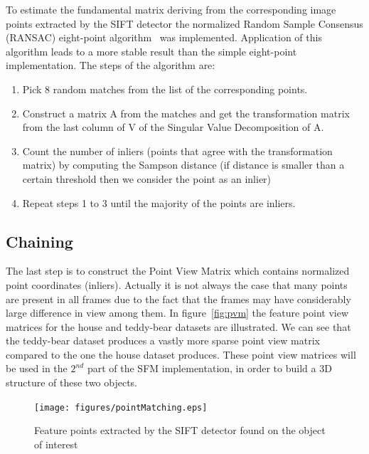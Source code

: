 To estimate the fundamental matrix deriving from the corresponding image points extracted by the SIFT detector the normalized Random Sample Consensus (RANSAC) eight-point algorithm~\cite{eight-point} was implemented. Application of this algorithm leads to a more stable result than the simple eight-point implementation. The steps of the algorithm are:

\begin{enumerate}[1]
  \item Pick 8 random matches from the list of the corresponding points.
  \item Construct a matrix A from the matches and get the transformation matrix from the last column of V of the Singular Value Decomposition of A.
  \item Count the number of inliers (points that agree with the transformation matrix) by computing the Sampson distance (if distance is smaller than a certain threshold then we consider the point as an inlier)
  \item Repeat steps 1 to 3 until the majority of the points are inliers.
\end{enumerate}


\subsection{Chaining}
The last step is to construct the Point View Matrix which contains normalized point coordinates (inliers). Actually it is not always the case that many points are present in all frames due to the fact that the frames may have considerably large difference in view among them. In figure~\ref{fig:pvm} the feature point view matrices for the house and teddy-bear datasets are illustrated. We can see that the teddy-bear dataset produces a vastly more sparse point view matrix compared to the one the house dataset produces. These point view matrices will be used in the $2^{nd}$ part of the SFM implementation, in order to build a 3D structure of these two objects.

\begin{figure}[ht!]
  \centering
    \texttt{[image: figures/pointMatching.eps]}
    \caption{Feature points extracted by the SIFT detector found on the object of interest}
    \label{fig:pointMatching}
\end{figure}

